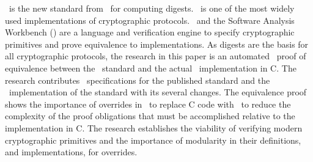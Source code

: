 \shaThree\ is the new standard from \nist\ for computing digests. 
\openssl\ is one of the most widely used implementations of cryptographic protocols.
\cryptol\ and the Software Analysis Workbench (\saw) are a language and verification engine to specify cryptographic primitives and prove equivalence to implementations.
As digests are the basis for all cryptographic protocols, the research in this paper is an automated \saw\ proof of equivalence between the \shaThree\ standard and the actual \openssl\ implementation in C.
The research contributes \cryptol\ specifications for the published standard and the \openssl\ implementation of the standard with its several changes.
The equivalence proof shows the importance of overrides in \saw\ to replace C code with \cryptol\ to reduce the complexity of the proof obligations that must be accomplished relative to the implementation in C.
The research establishes the viability of verifying modern cryptographic primitives and the importance of modularity in their definitions, and implementations, for overrides.

